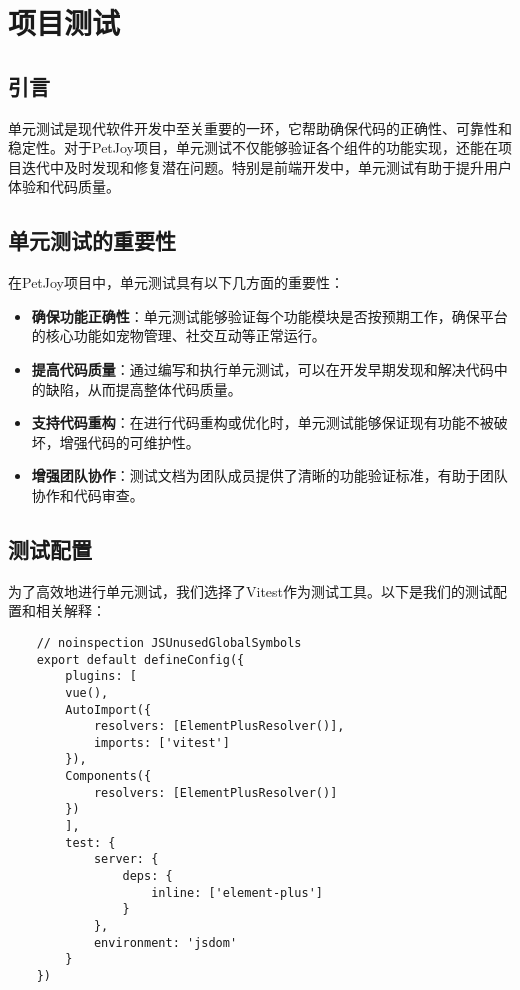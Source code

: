 \section{项目测试}\label{sec:Project_Testing}

\subsection{引言}

单元测试是现代软件开发中至关重要的一环，它帮助确保代码的正确性、可靠性和稳定性。对于PetJoy项目，单元测试不仅能够验证各个组件的功能实现，还能在项目迭代中及时发现和修复潜在问题。特别是前端开发中，单元测试有助于提升用户体验和代码质量。

\subsection{单元测试的重要性}

在PetJoy项目中，单元测试具有以下几方面的重要性：

\begin{itemize}
    \item \textbf{确保功能正确性}：单元测试能够验证每个功能模块是否按预期工作，确保平台的核心功能如宠物管理、社交互动等正常运行。
    \item \textbf{提高代码质量}：通过编写和执行单元测试，可以在开发早期发现和解决代码中的缺陷，从而提高整体代码质量。
    \item \textbf{支持代码重构}：在进行代码重构或优化时，单元测试能够保证现有功能不被破坏，增强代码的可维护性。
    \item \textbf{增强团队协作}：测试文档为团队成员提供了清晰的功能验证标准，有助于团队协作和代码审查。
\end{itemize}

\subsection{测试配置}

为了高效地进行单元测试，我们选择了Vitest作为测试工具。以下是我们的测试配置和相关解释：

\begin{verbatim}
	// noinspection JSUnusedGlobalSymbols
	export default defineConfig({
		plugins: [
		vue(),
		AutoImport({
			resolvers: [ElementPlusResolver()],
			imports: ['vitest']
		}),
		Components({
			resolvers: [ElementPlusResolver()]
		})
		],
		test: {
			server: {
				deps: {
					inline: ['element-plus']
				}
			},
			environment: 'jsdom'
		}
	})
\end{verbatim}

